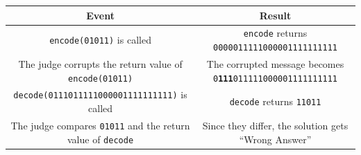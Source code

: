 \begin{table}[htbp]
  \centering
  \begin{tabular}{|c|c|}
      \hline
      \textbf{Event} & \textbf{Result} \\ \hline
      \texttt{encode(01011)} is called & \texttt{encode} returns \texttt{0000011111000001111111111} \\ \hline
      The judge corrupts the return value of \texttt{encode(01011)} & The corrupted message becomes
      \texttt{0\textbf{111}011111000001111111111} \\ \hline
      \texttt{decode(0111011111000001111111111)} is called & \texttt{decode} returns \texttt{11011} \\ \hline
      The judge compares \texttt{01011} and the return value of \texttt{decode} & Since they differ, the solution
      gets ``Wrong Answer'' \\ \hline 
  \end{tabular}
\end{table}

